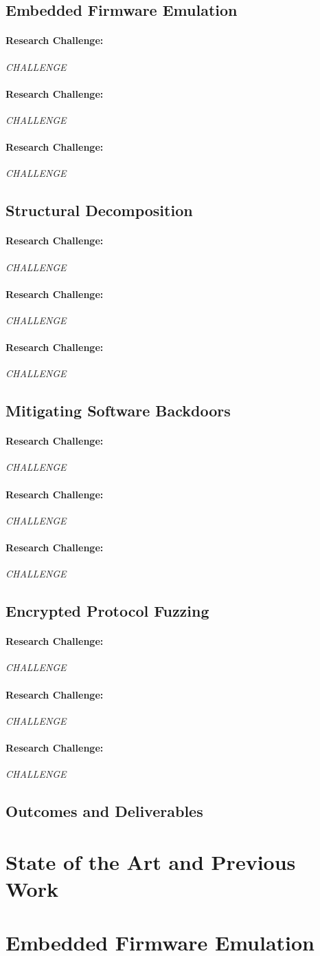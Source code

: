 \documentclass[letterpaper,twoside,11pt,headings=small]{scrartcl}
\newcommand{\challenge}[1]{\paragraph{Research Challenge:} \emph{#1}}
\begin{document}
\subsection{Embedded Firmware Emulation}
\label{sec:overview:firmware}

\challenge{CHALLENGE}

\challenge{CHALLENGE}

\challenge{CHALLENGE}

\subsection{Structural Decomposition}
\label{sec:overview:structure}

\challenge{CHALLENGE}

\challenge{CHALLENGE}

\challenge{CHALLENGE}

\subsection{Mitigating Software Backdoors}
\label{sec:overview:backdoors}

\challenge{CHALLENGE}

\challenge{CHALLENGE}

\challenge{CHALLENGE}

\subsection{Encrypted Protocol Fuzzing}
\label{sec:overview:fuzzing}

\challenge{CHALLENGE}

\challenge{CHALLENGE}

\challenge{CHALLENGE}

\subsection{Outcomes and Deliverables}
\label{sec:overview:outcomes}

\section{State of the Art and Previous Work}
\label{sec:related}

\section{Embedded Firmware Emulation}
\label{sec:research:firmware}
\end{document}
